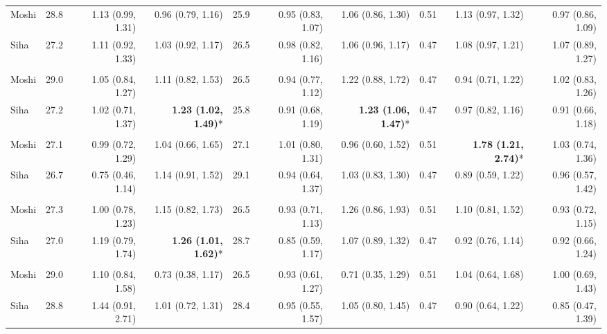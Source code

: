 \begin{table}[t]
\begin{tabular*}{\linewidth}{@{\extracolsep{\fill}}l|rrrrrrrrr}
\midrule\addlinespace[2.5pt]
\multicolumn{10}{l}{Peptic Ulcers} \\[2.5pt] 
\midrule\addlinespace[2.5pt]
Moshi & 28.8 & 1.13 (0.99, 1.31) & 0.96 (0.79, 1.16) & 25.9 & 0.95 (0.83, 1.07) & 1.06 (0.86, 1.30) & 0.51 & 1.13 (0.97, 1.32) & 0.97 (0.86, 1.09) \\ 
Siha & 27.2 & 1.11 (0.92, 1.33) & 1.03 (0.92, 1.17) & 26.5 & 0.98 (0.82, 1.16) & 1.06 (0.96, 1.17) & 0.47 & 1.08 (0.97, 1.21) & 1.07 (0.89, 1.27) \\ 
\midrule\addlinespace[2.5pt]
\multicolumn{10}{l}{Epilepsy} \\[2.5pt] 
\midrule\addlinespace[2.5pt]
Moshi & 29.0 & 1.05 (0.84, 1.27) & 1.11 (0.82, 1.53) & 26.5 & 0.94 (0.77, 1.12) & 1.22 (0.88, 1.72) & 0.47 & 0.94 (0.71, 1.22) & 1.02 (0.83, 1.26) \\ 
Siha & 27.2 & 1.02 (0.71, 1.37) & \textbf{1.23 (1.02, 1.49)}* & 25.8 & 0.91 (0.68, 1.19) & \textbf{1.23 (1.06, 1.47)}* & 0.47 & 0.97 (0.82, 1.16) & 0.91 (0.66, 1.18) \\ 
\midrule\addlinespace[2.5pt]
\multicolumn{10}{l}{Neuroses} \\[2.5pt] 
\midrule\addlinespace[2.5pt]
Moshi & 27.1 & 0.99 (0.72, 1.29) & 1.04 (0.66, 1.65) & 27.1 & 1.01 (0.80, 1.31) & 0.96 (0.60, 1.52) & 0.51 & \textbf{1.78 (1.21, 2.74)}* & 1.03 (0.74, 1.36) \\ 
Siha & 26.7 & 0.75 (0.46, 1.14) & 1.14 (0.91, 1.52) & 29.1 & 0.94 (0.64, 1.37) & 1.03 (0.83, 1.30) & 0.47 & 0.89 (0.59, 1.22) & 0.96 (0.57, 1.42) \\ 
\midrule\addlinespace[2.5pt]
\multicolumn{10}{l}{Psychoses} \\[2.5pt] 
\midrule\addlinespace[2.5pt]
Moshi & 27.3 & 1.00 (0.78, 1.23) & 1.15 (0.82, 1.73) & 26.5 & 0.93 (0.71, 1.13) & 1.26 (0.86, 1.93) & 0.51 & 1.10 (0.81, 1.52) & 0.93 (0.72, 1.15) \\ 
Siha & 27.0 & 1.19 (0.79, 1.74) & \textbf{1.26 (1.01, 1.62)}* & 28.7 & 0.85 (0.59, 1.17) & 1.07 (0.89, 1.32) & 0.47 & 0.92 (0.76, 1.14) & 0.92 (0.66, 1.24) \\ 
\midrule\addlinespace[2.5pt]
\multicolumn{10}{l}{Dysentery} \\[2.5pt] 
\midrule\addlinespace[2.5pt]
Moshi & 29.0 & 1.10 (0.84, 1.58) & 0.73 (0.38, 1.17) & 26.5 & 0.93 (0.61, 1.27) & 0.71 (0.35, 1.29) & 0.51 & 1.04 (0.64, 1.68) & 1.00 (0.69, 1.43) \\ 
Siha & 28.8 & 1.44 (0.91, 2.71) & 1.01 (0.72, 1.31) & 28.4 & 0.95 (0.55, 1.57) & 1.05 (0.80, 1.45) & 0.47 & 0.90 (0.64, 1.22) & 0.85 (0.47, 1.39) \\ 

\end{tabular*}
\end{table}
